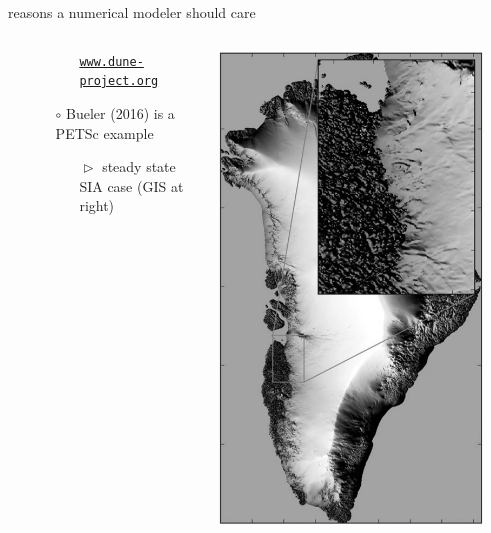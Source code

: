 \documentclass[10pt,hyperref,dvipsnames]{beamer}
\begin{document}
\begin{frame}{reasons a numerical modeler should care}
\begin{columns}
\begin{column}{0.65\textwidth}
\begin{enumerate}
\begin{itemize}
\begin{itemize}
        \href{https://www.dune-project.org/modules/dune-solvers/}{\texttt{www.dune-project.org}}
        \end{itemize}                
    \item[$\circ$] Bueler (2016) is a PETSc example
        \begin{itemize}
        \item[$\vartriangleright$] steady state SIA case (GIS at right)
        \end{itemize}                
    \end{itemize}
\end{enumerate}
\end{column}
\begin{column}{0.35\textwidth}
\hfill \includegraphics[width=0.9\textwidth]{figs/GISBueler2016.png}
\end{column}
\end{columns}
\end{frame}
\end{document}
